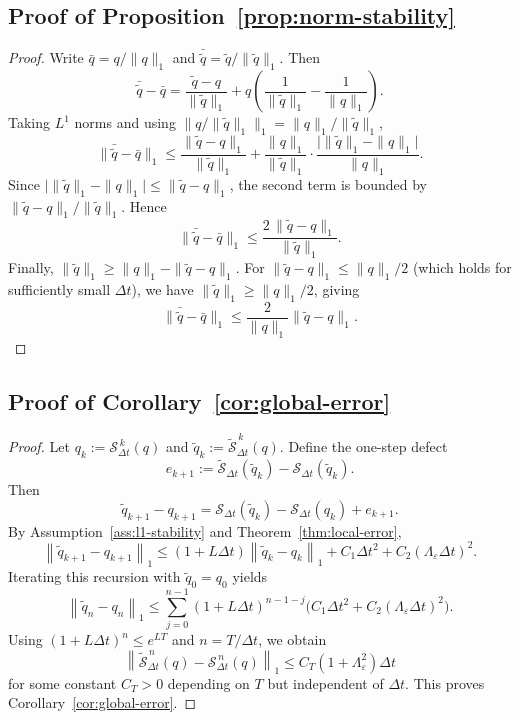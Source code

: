 \documentclass{article}
\begin{document}
\subsection{Proof of Proposition~\ref{prop:norm-stability}}\label{app:norm-stability}
\begin{proof}
Write $\bar{q} = q/\|q\|_1$ and $\bar{\tilde{q}} = \tilde{q}/\|\tilde{q}\|_1$. Then
\[
\bar{\tilde{q}} - \bar{q}
=
\frac{\tilde{q} - q}{\|\tilde{q}\|_1}
+
q\left(\frac{1}{\|\tilde{q}\|_1} - \frac{1}{\|q\|_1}\right).
\]
Taking $L^1$ norms and using $\|q/\|\tilde{q}\|_1\|_1 = \|q\|_1/\|\tilde{q}\|_1$,
\[
\|\bar{\tilde{q}} - \bar{q}\|_1
\le
\frac{\|\tilde{q} - q\|_1}{\|\tilde{q}\|_1}
+
\frac{\|q\|_1}{\|\tilde{q}\|_1}
\cdot
\frac{\bigl|\|\tilde{q}\|_1 - \|q\|_1\bigr|}{\|q\|_1}.
\]
Since $\bigl|\|\tilde{q}\|_1 - \|q\|_1\bigr| \le \|\tilde{q} - q\|_1$, the second term is bounded by $\|\tilde{q} - q\|_1 / \|\tilde{q}\|_1$. Hence
\[
\|\bar{\tilde{q}} - \bar{q}\|_1
\le
\frac{2\,\|\tilde{q} - q\|_1}{\|\tilde{q}\|_1}.
\]
Finally, $\|\tilde{q}\|_1 \ge \|q\|_1 - \|\tilde{q} - q\|_1$. For $\|\tilde{q} - q\|_1 \le \|q\|_1/2$ (which holds for sufficiently small $\Delta t$), we have $\|\tilde{q}\|_1 \ge \|q\|_1/2$, giving
\[
\|\bar{\tilde{q}} - \bar{q}\|_1
\le
\frac{2}{\|q\|_1}\|\tilde{q} - q\|_1.
\]
\end{proof}

\subsection{Proof of Corollary~\ref{cor:global-error}}\label{app:approx-global}
\begin{proof}
Let $q_k := \mathcal{S}_{\Delta t}^{\,k}(q)$ and $\tilde q_k := \widetilde{\mathcal{S}}_{\Delta t}^{\,k}(q)$. Define the one-step defect
\[
e_{k+1}
:=
\widetilde{\mathcal{S}}_{\Delta t}(\tilde q_k)
-
\mathcal{S}_{\Delta t}(\tilde q_k).
\]
Then
\[
\tilde q_{k+1}-q_{k+1}
=
\mathcal{S}_{\Delta t}(\tilde q_k)-\mathcal{S}_{\Delta t}(q_k)+e_{k+1}.
\]
By Assumption~\ref{ass:l1-stability} and Theorem~\ref{thm:local-error},
\[
\left\lVert \tilde q_{k+1}-q_{k+1} \right\rVert_1
\le
(1+L\Delta t)\left\lVert \tilde q_k-q_k \right\rVert_1
+
C_1\Delta t^2
+
C_2(\Lambda_{\varepsilon}\Delta t)^2.
\]
Iterating this recursion with $\tilde q_0=q_0$ yields
\[
\left\lVert \tilde q_n-q_n \right\rVert_1
\le
\sum_{j=0}^{n-1}
(1+L\Delta t)^{n-1-j}
\bigl(
C_1\Delta t^2 + C_2(\Lambda_{\varepsilon}\Delta t)^2
\bigr).
\]
Using $(1+L\Delta t)^n \le e^{LT}$ and $n=T/\Delta t$, we obtain
\[
\left\lVert
\widetilde{\mathcal{S}}_{\Delta t}^{\,n}(q)
-
\mathcal{S}_{\Delta t}^{\,n}(q)
\right\rVert_1
\le
C_T(1+\Lambda_{\varepsilon}^2)\Delta t
\]
for some constant $C_T>0$ depending on $T$ but independent of $\Delta t$. This proves Corollary~\ref{cor:global-error}.
\end{proof}
\end{document}
